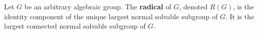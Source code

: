 Let $G$ be an arbitrary algebraic group. The \textbf{radical} of $G$, denoted $R(G)$, is the identity component of the unique largest normal solvable subgroup of $G$. It is the largest connected normal solvable subgroup of $G$.
